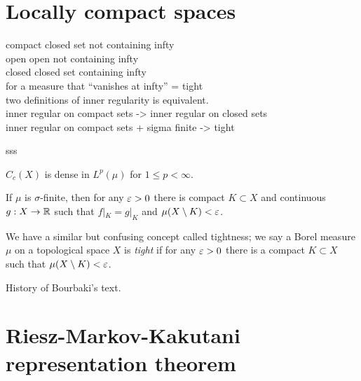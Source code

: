 \documentclass{../../large}
\begin{document}
\section{Locally compact spaces}


compact  closed set not containing infty\\
open     open not containing infty\\
closed   closed set containing infty\\

for a measure that ``vanishes at infty'' = tight\\
two definitions of inner regularity is equivalent.\\

inner regular on compact sets -> inner regular on closed sets\\
inner regular on compact sets + sigma finite -> tight\\

\begin{prb}
\end{prb}

\begin{prb}
sss
\begin{parts}
\item $C_c(X)$ is dense in $L^p(\mu)$ for $1\le p<\infty$.
\item If $\mu$ is $\sigma$-finite, then for any $\varepsilon>0$ there is compact $K\subset X$ and continuous $g:X\to\mathbb{R}$ such that $f|_K=g|_K$ and $\mu(X\setminus K)<\varepsilon$.
\end{parts}
\end{prb}


\begin{prb}
We have a similar but confusing concept called tightness; we say a Borel measure $\mu$ on a topological space $X$ is \emph{tight} if for any $\varepsilon>0$ there is a compact $K\subset X$ such that $\mu(X\setminus K)<\varepsilon$.

History of Bourbaki's text.
\begin{parts}
\item
\end{parts}
\end{prb}





\section{Riesz-Markov-Kakutani representation theorem}
\end{document}
